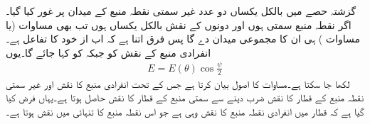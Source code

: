 گزشتہ حصے میں بالکل یکساں دو عدد غیر سمتی نقطہ منبع کے میدان پر غور کیا گیا۔اگر نقطہ منبع سمتی ہوں  اور دونوں کے نقش بالکل یکساں ہوں تب بھی مساوات  (یا مساوات ) ہی ان کا مجموعی میدان دے گا پس فرق اتنا ہے کہ اب  از خود  کا تفاعل  ہے۔ انفرادی منبع کے نقش  کو  جبکہ  کو   کہا جائے گا۔یوں
\begin{align}\label{مساوات_اینٹینا_ضرب_نقش}
E=E(\theta) \cos \frac{\psi}{2}
\end{align}
لکھا جا سکتا ہے۔مساوات   کا اصول بیان کرتا ہے جس کے تحت انفرادی منبع کا نقش اور غیر سمتی نقطہ منبع کے قطار کا نقش ضرب دینے سے سمتی منبع کے قطار کا نقش حاصل ہوتا ہے۔یہاں فرض کیا گیا ہے کہ قطار میں انفرادی نقطہ منبع کا نقش وہی ہے جو اس نقطہ منبع کا تنہائی میں نقش ہوتا ہے۔

